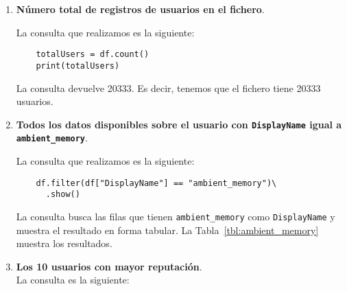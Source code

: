 \documentclass[12pt,a4paper,twoside,openright,titlepage,final]{article}
\begin{document}
\begin{enumerate}
	\item \textbf{Número total de registros de usuarios en el fichero}.
	
	La consulta que realizamos es la siguiente:
	
	\begin{verbatim}
	totalUsers = df.count()
	print(totalUsers)
	\end{verbatim}
	
	La consulta devuelve 20333. Es decir, tenemos que el fichero tiene 20333 usuarios.
	
	\item \textbf{Todos los datos disponibles sobre el usuario con \texttt{DisplayName} igual a \texttt{ambient\_memory}}.
	
	La consulta que realizamos es la siguiente:
	
	\begin{verbatim}
	df.filter(df["DisplayName"] == "ambient_memory")\
	  .show()
	\end{verbatim}
	
	La consulta busca las filas que tienen \texttt{ambient\_memory} como \texttt{DisplayName} y muestra el resultado en forma tabular. La Tabla~\ref{tbl:ambient_memory} muestra los resultados.
	
	\begin{table}[htbp!]
		\centering
		\caption{Información del usuario \texttt{ambient\_memory}}
		\label{tbl:ambient_memory}
	\end{table}
	
	\item \textbf{Los 10 usuarios con mayor reputación}.\\
	
	La consulta es la siguiente:
	

\end{enumerate}
\end{document}
